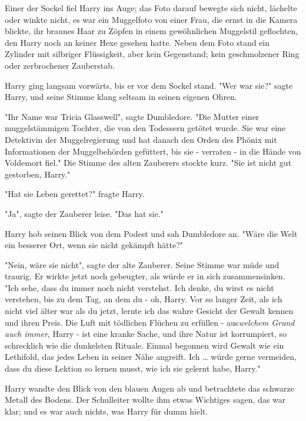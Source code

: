 {Einer der Sockel fiel Harry ins Auge; das Foto darauf bewegte sich nicht, lächelte oder winkte nicht, es war ein Muggelfoto von einer Frau, die ernst in die Kamera blickte, ihr braunes Haar zu Zöpfen in einem gewöhnlichen Muggelstil geflochten, den Harry noch an keiner Hexe gesehen hatte. Neben dem Foto stand ein Zylinder mit silbriger Flüssigkeit, aber kein Gegenstand; kein geschmolzener Ring oder zerbrochener Zauberstab.

Harry ging langsam vorwärts, bis er vor dem Sockel stand. "Wer war sie?" sagte Harry, und seine Stimme klang seltsam in seinen eigenen Ohren.

"Ihr Name war Tricia Glasswell", sagte Dumbledore. "Die Mutter einer muggelstämmigen Tochter, die von den Todessern getötet wurde. Sie war eine Detektivin der Muggelregierung und hat danach den Orden des Phönix mit Informationen der Muggelbehörden gefüttert, bis sie - verraten - in die Hände von Voldemort fiel." Die Stimme des alten Zauberers stockte kurz. "Sie ist nicht gut gestorben, Harry."

"Hat sie Leben gerettet?" fragte Harry.

"Ja", sagte der Zauberer leise. "Das hat sie."

Harry hob seinen Blick von dem Podest und sah Dumbledore an. "Wäre die Welt ein besserer Ort, wenn sie nicht gekämpft hätte?"

"Nein, wäre sie nicht", sagte der alte Zauberer. Seine Stimme war müde und traurig. Er wirkte jetzt noch gebeugter, als würde er in sich zusammensinken. "Ich sehe, dass du immer noch nicht verstehst. Ich denke, du wirst es nicht verstehen, bis zu dem Tag, an dem du - oh, Harry. Vor so langer Zeit, als ich nicht viel älter war als du jetzt, lernte ich das wahre Gesicht der Gewalt kennen und ihren Preis. Die Luft mit tödlichen Flüchen zu erfüllen - aus\emph{welchem Grund auch immer}, Harry - ist eine kranke Sache, und ihre Natur ist korrumpiert, so schrecklich wie die dunkelsten Rituale. Einmal begonnen wird Gewalt wie ein Lethifold, das jedes Leben in seiner Nähe angreift. Ich … würde gerne vermeiden, dass du diese Lektion so lernen musst, wie ich sie gelernt habe, Harry."

Harry wandte den Blick von den blauen Augen ab und betrachtete das schwarze Metall des Bodens. Der Schulleiter wollte ihm etwas Wichtiges sagen, das war klar; und es war auch nichts, was Harry für dumm hielt.

}
